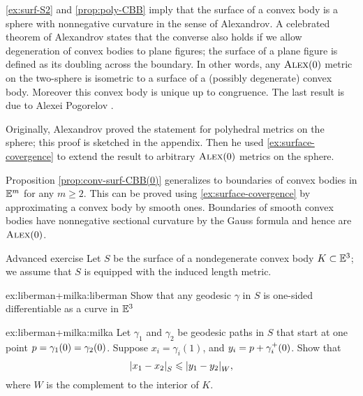 \ref{ex:surf-S2} and \ref{prop:poly-CBB} imply that the surface of a convex body is a sphere with nonnegative curvature in the sense of Alexandrov.
A celebrated theorem of Alexandrov states that the converse also holds if we allow degeneration of convex bodies to plane figures;
the surface of a plane figure is defined as its doubling across the boundary.
In other words, any $\textsc{Alex}(0)$ metric on the two-sphere is isometric to a surface of a (possibly degenerate) convex body.
Moreover this convex body is unique up to congruence.
The last result is due to Alexei Pogorelov \cite{pogorelov}.

Originally, Alexandrov proved the statement for polyhedral metrics on the sphere; this proof is sketched in the appendix.
Then he used \ref{ex:surface-covergence} to extend the result to  arbitrary $\textsc{Alex}(0)$ metrics on the sphere.

Proposition \ref{prop:conv-surf-CBB(0)} generalizes to boundaries of convex bodies  in $\mathbb{E}^m$ for any $m\ge 2$.
This can be proved using \ref{ex:surface-covergence} by approximating a convex body by smooth ones.
Boundaries of smooth convex bodies have nonnegative sectional curvature by the Gauss formula and hence are $\textsc{Alex}(0)$.


\begin{thm}{Advanced exercise}\label{ex:liberman+milka}
Let $S$ be the surface of a nondegenerate convex body $K\subset\mathbb{E}^3$;
we assume that $S$ is equipped with the induced length metric.

\begin{subthm}{ex:liberman+milka:liberman}
Show that any geodesic $\gamma$ in $S$ is one-sided differentiable as a curve in $\mathbb{E}^3$ 
\end{subthm}

\begin{subthm}{ex:liberman+milka:milka}
Let $\gamma_1$ and $\gamma_2$ be geodesic paths in $S$ that start at one point $p=\gamma_1(0)=\gamma_2(0)$.
Suppose $x_i=\gamma_i(1)$, and $y_i=p+\gamma_i^+(0)$.
Show that 
\[|{x_1}-{x_2}|_{S}^{{}}\leqslant |{y_1}-{y_2}|_{W}^{{}},\]
where $W$ is the complement to the interior of $K$.
\end{subthm}

\end{thm}

